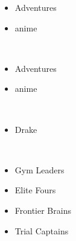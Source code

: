 \documentclass[a4paper,12pt]{article}
\begin{document}
\begin{itemize}
\item Adventures
\item anime
\end{itemize}\\ \par \vspace{0.5cm}

\begin{itemize}
\item Adventures
\item anime
\end{itemize}\\ \par \vspace{0.5cm}

\begin{itemize}
\item Drake
\end{itemize}\\ \par \vspace{0.5cm}

\begin{itemize}
\item Gym Leaders
\item Elite Fours
\item Frontier Brains
\item Trial Captains
\end{itemize}\\ \par \vspace{0.5cm}
\end{document}
